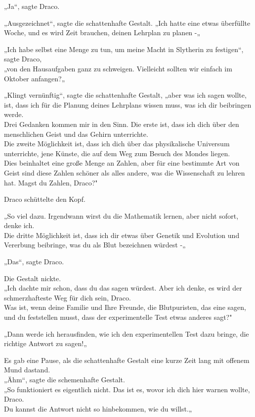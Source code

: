 {„Ja“, sagte Draco.

„Ausgezeichnet“, sagte die schattenhafte Gestalt. „Ich hatte eine etwas überfüllte Woche, und es wird Zeit brauchen, deinen Lehrplan zu planen -„

„Ich habe selbst eine Menge zu tun, um meine Macht in Slytherin zu festigen“, sagte Draco,\\ „von den Hausaufgaben ganz zu schweigen. Vielleicht sollten wir einfach im Oktober anfangen?„

„Klingt vernünftig“, sagte die schattenhafte Gestalt, „aber was ich sagen wollte, ist, dass ich für die Planung deines Lehrplans wissen muss, was ich dir beibringen werde.\\ Drei Gedanken kommen mir in den Sinn. Die erste ist, dass ich dich über den menschlichen Geist und das Gehirn unterrichte.\\ Die zweite Möglichkeit ist, dass ich dich über das physikalische Universum unterrichte, jene Künste, die auf dem Weg zum Besuch des Mondes liegen.\\ Dies beinhaltet eine große Menge an Zahlen, aber für eine bestimmte Art von Geist sind diese Zahlen schöner als alles andere, was die Wissenschaft zu lehren hat. Magst du Zahlen, Draco?"

Draco schüttelte den Kopf.

„So viel dazu. Irgendwann wirst du die Mathematik lernen, aber nicht sofort, denke ich.\\ Die dritte Möglichkeit ist, dass ich dir etwas über Genetik und Evolution und Vererbung beibringe, was du als Blut bezeichnen würdest -„

„Das“, sagte Draco.

Die Gestalt nickte.\\ „Ich dachte mir schon, dass du das sagen würdest. Aber ich denke, es wird der schmerzhafteste Weg für dich sein, Draco.\\ Was ist, wenn deine Familie und Ihre Freunde, die Blutpuristen, das eine sagen, und du feststellen musst, dass der experimentelle Test etwas anderes sagt?"

„Dann werde ich herausfinden, wie ich den experimentellen Test dazu bringe, die richtige Antwort zu sagen!„

Es gab eine Pause, als die schattenhafte Gestalt eine kurze Zeit lang mit offenem Mund dastand.\\ „Ähm“, sagte die schemenhafte Gestalt.\\ „So funktioniert es eigentlich nicht. Das ist es, wovor ich dich hier warnen wollte, Draco.\\ Du kannst die Antwort nicht so hinbekommen, wie du willst.„

}
